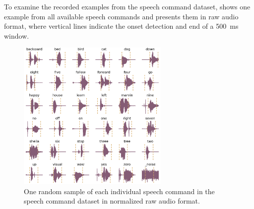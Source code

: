 To examine the recorded examples from the speech command dataset,  shows one example from all available speech commands and presents them in raw audio format, where vertical lines indicate the onset detection and end of a \SI{500}{\milli\second} window.
\begin{figure}[!ht]
  \centering
    \includegraphics[width=0.65\textwidth]{./5_exp/figs/exp_dataset_speech_cmd_wav_grid.png}
  \caption{One random sample of each individual speech command in the speech command dataset in normalized raw audio format.}
  \label{fig:exp_dataset_speech_cmd_wav_grid}
\end{figure}
\FloatBarrier
\noindent



